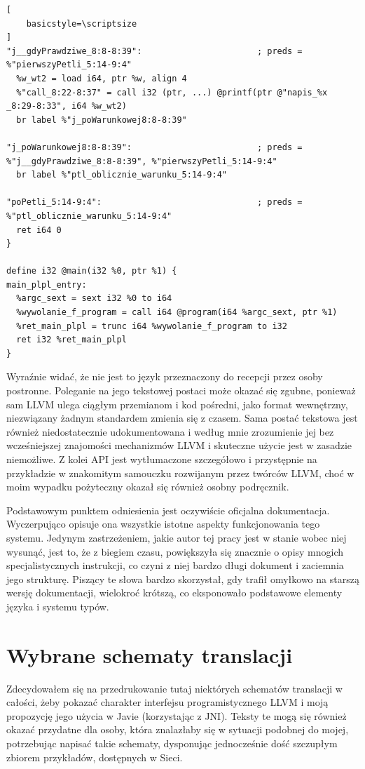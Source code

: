 \begin{lstlisting}[
    basicstyle=\scriptsize
]
"j__gdyPrawdziwe_8:8-8:39":                       ; preds = %"pierwszyPetli_5:14-9:4"
  %w_wt2 = load i64, ptr %w, align 4
  %"call_8:22-8:37" = call i32 (ptr, ...) @printf(ptr @"napis_%x _8:29-8:33", i64 %w_wt2)
  br label %"j_poWarunkowej8:8-8:39"

"j_poWarunkowej8:8-8:39":                         ; preds = %"j__gdyPrawdziwe_8:8-8:39", %"pierwszyPetli_5:14-9:4"
  br label %"ptl_oblicznie_warunku_5:14-9:4"

"poPetli_5:14-9:4":                               ; preds = %"ptl_oblicznie_warunku_5:14-9:4"
  ret i64 0
}

define i32 @main(i32 %0, ptr %1) {
main_plpl_entry:
  %argc_sext = sext i32 %0 to i64
  %wywolanie_f_program = call i64 @program(i64 %argc_sext, ptr %1)
  %ret_main_plpl = trunc i64 %wywolanie_f_program to i32
  ret i32 %ret_main_plpl
}

\end{lstlisting}

Wyraźnie widać, że nie jest to język przeznaczony do recepcji przez osoby postronne. Poleganie na jego tekstowej postaci może okazać się zgubne, ponieważ sam LLVM ulega ciągłym przemianom i kod pośredni, jako format wewnętrzny, niezwiązany żadnym standardem zmienia się z czasem. Sama postać tekstowa jest również niedostatecznie udokumentowana i według mnie zrozumienie jej bez wcześniejszej znajomości mechanizmów LLVM i skuteczne użycie jest w zasadzie niemożliwe. Z kolei API jest wytłumaczone szczegółowo i przystępnie na przykładzie w znakomitym samouczku rozwijanym przez twórców LLVM\cite{kalleidoscope}, choć w moim wypadku pożyteczny okazał się również osobny podręcznik\cite{llvm_nacke_textbook}.

Podstawowym punktem odniesienia  jest oczywiście oficjalna dokumentacja\cite{llvm_lang_ref}. Wyczerpująco opisuje ona wszystkie istotne aspekty funkcjonowania tego systemu. Jedynym zastrzeżeniem, jakie autor tej pracy jest w stanie wobec niej wysunąć, jest to, że z biegiem czasu, powiększyła się znacznie o opisy mnogich specjalistycznych instrukcji, co czyni z niej bardzo długi dokument i zaciemnia jego strukturę. Piszący te słowa bardzo skorzystał, gdy trafił omyłkowo na starszą wersję dokumentacji, wielokroć krótszą, co eksponowało podstawowe elementy języka i systemu typów.

\section{Wybrane schematy translacji}
Zdecydowałem się na przedrukowanie tutaj niektórych schematów translacji w całości, żeby pokazać charakter interfejsu programistycznego LLVM i moją propozycję jego użycia w Javie (korzystając z JNI). Teksty te mogą się również okazać przydatne dla osoby, która znalazłaby się w sytuacji podobnej do mojej, potrzebując napisać takie schematy, dysponując jednocześnie dość szczupłym zbiorem przykładów, dostępnych w Sieci.

